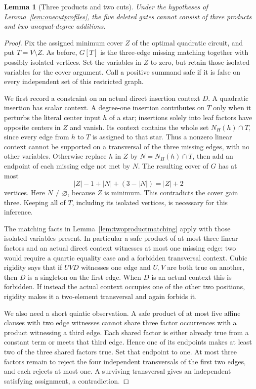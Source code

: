 \documentclass[11pt]{article}
\newtheorem{lemma}[theorem]{Lemma}
\theoremstyle{definition}
\theoremstyle{remark}
\begin{document}
\begin{lemma}[Three products and two cuts]\label{lem:threeproductstwocuts}
Under the hypotheses of Lemma~\ref{lem:onecutprofiles}, the five deleted gates cannot consist of three products and two unequal-degree additions.
\end{lemma}
\begin{proof}
Fix the assigned minimum cover $Z$ of the optimal quadratic circuit, and put $T=V\setminus Z$. As before, $G[T]$ is the three-edge missing matching together with possibly isolated vertices. Set the variables in $Z$ to zero, but retain those isolated variables for the cover argument. Call a positive summand safe if it is false on every independent set of this restricted graph.

We first record a constraint on an actual direct insertion context $D$. A quadratic insertion has scalar context. A degree-one insertion contributes on $T$ only when it perturbs the literal center input $h$ of a star; insertions solely into leaf factors have opposite centers in $Z$ and vanish. Its context contains the whole set $N_H(h)\cap T$, since every edge from $h$ to $T$ is assigned to that star. Thus a nonzero linear context cannot be supported on a transversal of the three missing edges, with no other variables. Otherwise replace $h$ in $Z$ by $N=N_H(h)\cap T$, then add an endpoint of each missing edge not met by $N$. The resulting cover of $G$ has at most
\[
 |Z|-1+|N|+(3-|N|)=|Z|+2
\]
vertices. Here $N\ne\varnothing$, because $Z$ is minimum. This contradicts the cover gain three. Keeping all of $T$, including its isolated vertices, is necessary for this inference.

The matching facts in Lemma~\ref{lem:twoproductmatching} apply with those isolated variables present. In particular a safe product of at most three linear factors and an actual direct context witnesses at most one missing edge: two would require a quartic equality case and a forbidden transversal context. Cubic rigidity says that if $UVD$ witnesses one edge and $U,V$ are both true on another, then $D$ is a singleton on the first edge. When $D$ is an actual context this is forbidden. If instead the actual context occupies one of the other two positions, rigidity makes it a two-element transversal and again forbids it.

We also need a short quintic observation. A safe product of at most five affine clauses with two edge witnesses cannot share three factor occurrences with a product witnessing a third edge. Each shared factor is either already true from a constant term or meets that third edge. Hence one of its endpoints makes at least two of the three shared factors true. Set that endpoint to one. At most three factors remain to reject the four independent transversals of the first two edges, and each rejects at most one. A surviving transversal gives an independent satisfying assignment, a contradiction.


\end{proof}
\end{document}
